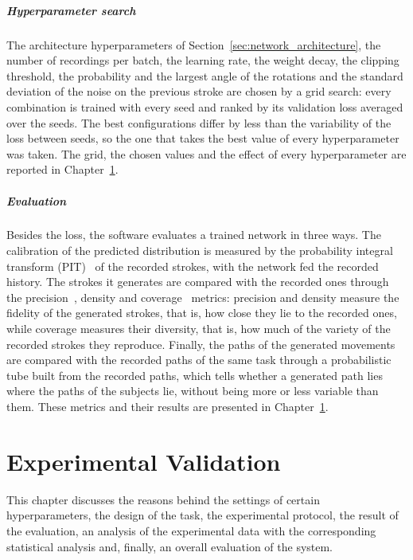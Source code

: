 \documentclass[12pt]{report}
\begin{document}
\paragraph{Hyperparameter search}
The architecture hyperparameters of Section~\ref{sec:network_architecture}, the number of recordings per batch, the learning rate, the weight decay, the clipping threshold, the probability and the largest angle of the rotations and the standard deviation of the noise on the previous stroke are chosen by a grid search: every combination is trained with every seed and ranked by its validation loss averaged over the seeds. The best configurations differ by less than the variability of the loss between seeds, so the one that takes the best value of every hyperparameter was taken. The grid, the chosen values and the effect of every hyperparameter are reported in Chapter~\ref{ch:validation}.

\paragraph{Evaluation}
Besides the loss, the software evaluates a trained network in three ways. The calibration of the predicted distribution is measured by the probability integral transform (PIT)~\cite{gneiting2007probabilistic} of the recorded strokes, with the network fed the recorded history. The strokes it generates are compared with the recorded ones through the precision~\cite{kynkaanniemi2019improved}, density and coverage~\cite{naeem2020reliable} metrics: precision and density measure the fidelity of the generated strokes, that is, how close they lie to the recorded ones, while coverage measures their diversity, that is, how much of the variety of the recorded strokes they reproduce. Finally, the paths of the generated movements are compared with the recorded paths of the same task through a probabilistic tube built from the recorded paths, which tells whether a generated path lies where the paths of the subjects lie, without being more or less variable than them. These metrics and their results are presented in Chapter~\ref{ch:validation}.

\chapter{Experimental Validation}
\label{ch:validation}
This chapter discusses the reasons behind the settings of certain hyperparameters, the design of the task, the experimental protocol, the result of the evaluation, an analysis of the experimental data with the corresponding statistical analysis and, finally, an overall evaluation of the system.
\end{document}
